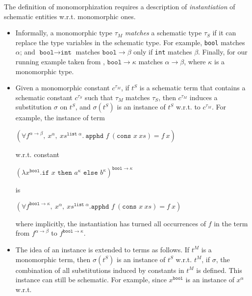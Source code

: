 \documentclass{article}
\begin{document}
		The definition of monomorphization 
		requires a description of 
		\textit{instantiation} of schematic 
		entities w.r.t. 
		monomorphic ones.
		\begin{itemize}
		\item Informally, a monomorphic type 
			$\tau_M$ \textit{matches} a schematic 
			type $\tau_S$ if it can replace the 
			type variables in the schematic 
			type. For example, \texttt{bool} 
			matches $\alpha$; and $\texttt{bool} 
			\to \texttt{int}$ matches 
			$\texttt{bool} \to \beta$
			only if \texttt{int} matches 
			$\beta$. Finally, for our running 
			example taken from \cite{bohme}, 
			${\texttt{bool} \to \kappa}$
			matches $\alpha \to \beta$,
			where $\kappa$ is a monomorphic
			type. 
			
		\item Given a monomorphic constant 
			$c^{\tau_M}$,  if $t^S$ is a 
			schematic term that contains a 
			schematic constant $c^{\tau_S}$ 
			such that $\tau_M$ matches 
			$\tau_S$, then $c^{\tau_M}$ induces 
			a substitution $\sigma$ on $t^S$, 
			and $\sigma(t^S)$ is an instance of 
			$t^S$ w.r.t. to $c^{\tau_M}$. 
			For example, the instance of term
			\begin{center}
				$(\forall f^{\alpha \to \beta},\ 
				x^{\alpha},\ xs^{\texttt{list }
				\alpha}.\ \texttt{apphd }f\ 
				(\texttt{cons }x\ xs) = f\ x)$
			\end{center} 
			w.r.t. constant
			\begin{center}
				$(\lambda x^{\texttt{bool}}.
				\texttt{if }x\texttt{ then }
				a^{\kappa} \texttt{ else }
				b^{\kappa})^{\texttt{bool} \to 
				\kappa}$ 
			\end{center}
			is
			\begin{center}
				$(\forall f^{\texttt{bool} 
				\to \kappa},\ x^{\alpha},\ 
				xs^{\texttt{list }\alpha}. 
				\texttt{apphd }f\ (\texttt{cons }
				x \ xs) = f\ x)$
			\end{center}
			where implicitly, the instantiation 
			has turned all occurrences of $f$ 
			in the term from $f^{\alpha \to \beta}$ 
			to $f^{\texttt{bool} \to \kappa}$.
		\item The idea of an instance is 
			extended to terms as follows. If 
			$t^M$ is a monomorphic term, then 
			$\sigma(t^S)$ is an instance of 
			$t^S$ w.r.t. $t^M$, if 
			$\sigma$, the combination of all 
			substitutions induced by constants 
			in $t^M$ is defined. This instance 
			can still be schematic. For example, 
			since $x^{\texttt{bool}}$ is an 
			instance of $x^{\alpha}$ w.r.t.

\end{itemize}
\end{document}
